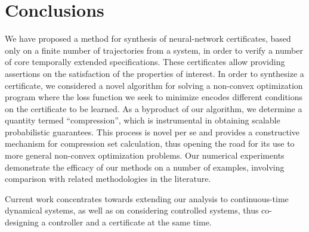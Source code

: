 \section{Conclusions}
\label{sec:conc}

We have proposed a method for synthesis of neural-network certificates, based only on a finite number of trajectories from a system, in order to verify a number of core temporally extended specifications.  
These certificates allow providing assertions on the satisfaction of the properties of interest. 
In order to synthesize a certificate, we considered a novel algorithm for solving a non-convex optimization program where the loss function we seek to minimize encodes different conditions on the certificate to be learned. 
As a byproduct of our algorithm, we determine a quantity termed ``compression'', which is instrumental in obtaining scalable probabilistic guarantees. 
This process is novel per se and provides a constructive mechanism for compression set calculation, thus opening the road for its use to more general
non-convex optimization problems.
Our numerical experiments demonstrate the efficacy of our methods on a number of examples, involving comparison with related methodologies in the literature. 

Current work concentrates towards extending our analysis to continuous-time dynamical systems, as well as on considering controlled systems, thus co-designing a controller and a certificate at the same time.